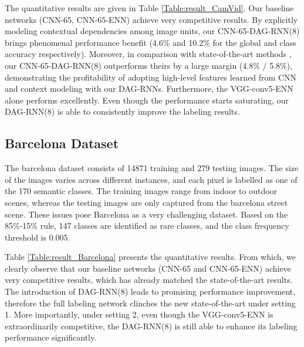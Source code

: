 \documentclass[10pt,twocolumn,letterpaper]{article}
\begin{document}
The quantitative results are given in Table \ref{Table:result_CamVid}. Our baseline networks (CNN-65, CNN-65-ENN) achieve very competitive results. By explicitly modeling contextual dependencies among image units, our CNN-65-DAG-RNN(8) brings phenomenal performance benefit (4.6\% and 10.2\% for the global and class accuracy respectively). Moreover, in comparison with state-of-the-art methods \cite{bulo2014neural}\cite{ladicky2010and}\cite{sturgess2009combining} \cite{tighe2013finding},  our CNN-65-DAG-RNN(8) outperforms theirs by a large margin (4.8\% / 5.8\%), demonstrating the profitability of adopting high-level features learned from CNN and context modeling with our DAG-RNNs.
Furthermore, the VGG-conv5-ENN alone performs excellently. Even though the performance starts saturating, our DAG-RNN(8) is able to consistently improve the labeling results.








\subsection{Barcelona Dataset}
The barcelona dataset \cite{tighe2010superparsing} consists of 14871 training
and 279 testing  images. The size of the images varies across different instances, and each pixel is labelled as one of the 170 semantic classes. The training images range from indoor to outdoor scenes, whereas the testing images are only captured from the barcelona street scene. These issues pose Barcelona as a very challenging dataset. Based on the 85\%-15\% rule, 147 classes are identified as rare classes, and the class frequency threshold  is 0.005.

Table \ref{Table:result_Barcelona} presents the quantitative results. From which, we clearly observe that our baseline networks (CNN-65 and CNN-65-ENN) achieve very competitive results, which has already matched the state-of-the-art results. The introduction of DAG-RNN(8) leads to promising performance improvement, therefore the full labeling network clinches the new state-of-the-art under setting 1. More importantly, under setting 2, even though the VGG-conv5-ENN is extraordinarily competitive, the DAG-RNN(8) is still able to enhance its labeling performance significantly.
\end{document}

